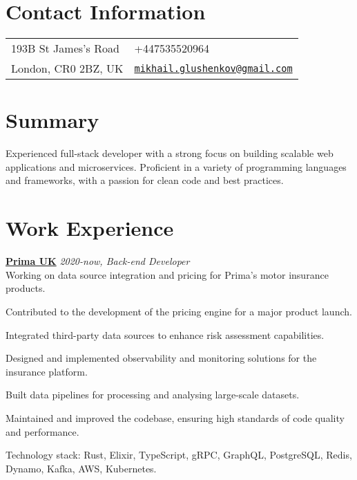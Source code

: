 \documentclass[margin,line]{res}
\begin{document}

\begin{resume}
      \section{\sc Contact Information}
      \vspace{.05in}
      \begin{tabular}{@{}p{2in}p{4in}}
            193B St James's Road &
            +447535520964                           \\
            London, CR0 2BZ, UK  &
            \href{mailto:mikhail.glushenkov@gmail.com}
            {\texttt{mikhail.glushenkov@gmail.com}} \\
      \end{tabular}

      \section{\sc Summary} Experienced full-stack developer with a strong focus
      on building scalable web applications and microservices. Proficient in a
      variety of programming languages and frameworks, with a passion for clean
      code and best practices.

      \section{\sc Work Experience}

       {\bf \href{https://helloprima.co.uk}{Prima UK}} \hfill {\it 2020-now, Back-end Developer}\\
      Working on data source integration and pricing for Prima's motor insurance
      products.\\
      \begin{list}{}{\leftmargin=1.5em}
            \item Contributed to the development of the pricing engine for a major
                  product launch.
            \item Integrated third-party data sources to enhance risk assessment
                  capabilities.
            \item Designed and implemented observability and monitoring solutions
                  for the insurance platform.
            \item Built data pipelines for processing and analysing large-scale
                  datasets.
            \item Maintained and improved the codebase, ensuring high standards of
                  code quality and performance.
      \end{list}
      Technology stack: Rust, Elixir, TypeScript, gRPC, GraphQL, PostgreSQL, Redis, Dynamo, Kafka, AWS, Kubernetes.


\end{resume}
\end{document}
